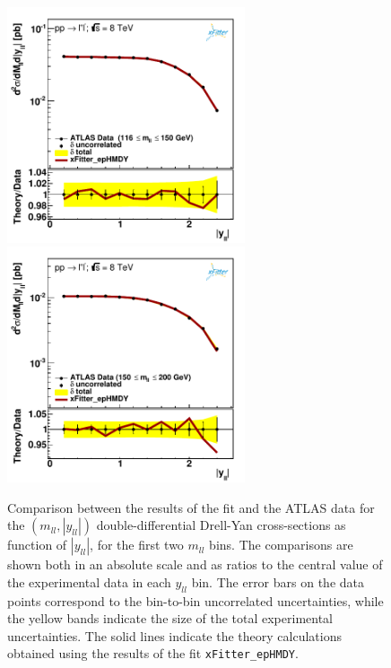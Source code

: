 \begin{figure}[t]
\centering
\includegraphics[width=7cm]{figs/data_401-1.pdf}
\includegraphics[width=7cm]{figs/data_402-1.pdf}
\caption{Comparison between the results of the fit and the ATLAS data
  for the $(m_{ll},|y_{ll}|)$ double-differential Drell-Yan cross-sections
  as function of $|y_{ll}|$, for the first two $m_{ll}$ bins.
  The comparisons are shown both
  in an absolute scale and as ratios to the central value
  of the experimental data in each $y_{ll}$ bin.
  The error bars on the data points correspond to the bin-to-bin uncorrelated
  uncertainties, while the yellow bands
  indicate the size of the total experimental uncertainties.
  The solid lines indicate the theory calculations obtained using the results
  of the fit {\tt xFitter\_epHMDY}.
}
\label{hmDY_2D_1}
\end{figure}

